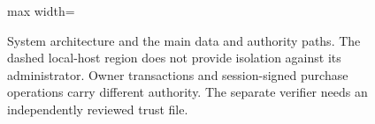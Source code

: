 \begin{figure}[htbp]
\begin{adjustbox}{max width=\linewidth}
\end{adjustbox}
\caption{System architecture and the main data and authority paths. The dashed local-host region does not provide isolation against its administrator. Owner transactions and session-signed purchase operations carry different authority. The separate verifier needs an independently reviewed trust file.}\label{fig:architecture}
\end{figure}
